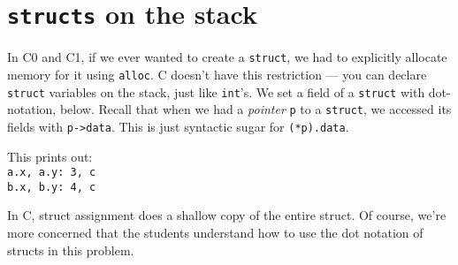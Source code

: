 \section*{\lstinline'structs' on the stack%
}

In C0 and C1, if we ever wanted to create a \lstinline'struct', we had
to explicitly allocate memory for it using
\lstinline'alloc'. C doesn't have this restriction ---
you can declare \lstinline'struct' variables on the stack, just like
\lstinline'int''s.  We set a field of a \lstinline'struct' with
dot-notation, below. Recall that when we had a \emph{pointer} \lstinline'p' to a
\lstinline'struct', we accessed its fields with
\lstinline'p->data'. This is just syntactic sugar for
\lstinline'(*p).data'.
\bgroup
\smalllistings

\egroup

\begin{solution}
This prints out:\\
\lstinline'a.x, a.y: 3, c'\\
\lstinline'b.x, b.y: 4, c'

In C, struct assignment does a shallow copy of the entire struct. Of course,
we're more concerned that the students understand how to use the dot notation of
structs in this problem.
\end{solution}
